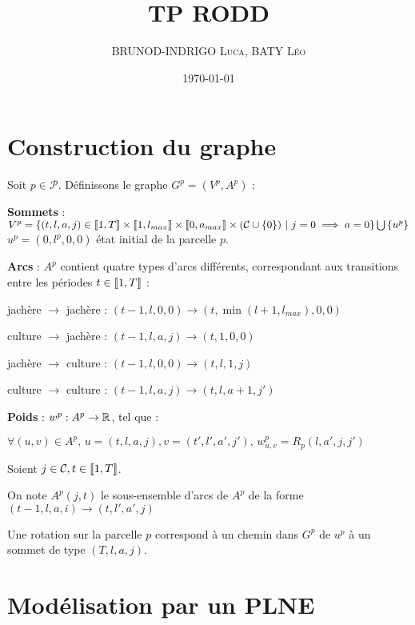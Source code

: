 \documentclass[12pt]{article}
\title{TP RODD}
\date{\today}
\author{\textsc{BRUNOD-INDRIGO Luca}, \textsc{BATY Léo}}
\begin{document}
\maketitle

\section{Construction du graphe}

\noindent Soit $p\in \mathcal{P}$. Définissons le graphe $G^p = (V^p, A^p)$ :
\begin{arrowlist}
    \item \textbf{Sommets} : $V^p = \{ (t, l, a, j)\in \llb 1, T \rrb \times \llb 1, l_{max} \rrb \times \llb 0, a_{max} \rrb \times (\mathcal{C} \cup \{0\}) | j=0 \implies a=0 \}\bigcup\, \{u^p\}$
    $u^p = (0, l^p, 0, 0)$ état initial de la parcelle $p$.
    \item \textbf{Arcs} : $A^p$ contient quatre types d'arcs différents, correspondant aux transitions entre les périodes $t\in \llbracket 1, T \rrbracket$ :
    \begin{bulletlist}
        \item jachère $\rightarrow$ jachère : $(t-1, l, 0, 0) \rightarrow (t, \min(l+1, l_{max}), 0, 0)$
        \item culture $\rightarrow$ jachère : $(t-1, l, a, j) \rightarrow (t, 1, 0, 0)$
        \item jachère $\rightarrow$ culture : $(t-1, l, 0, 0) \rightarrow (t, l, 1, j)$
        \item culture $\rightarrow$ culture : $(t-1, l, a, j) \rightarrow (t, l, a+1, j')$
    \end{bulletlist}
    \item \textbf{Poids} : $w^p : A^p \rightarrow \mathbb{R}$, tel que : 
    
    $\forall(u, v)\in A^p,\, u = (t, l, a, j), v = (t', l', a', j'),\, \boxed{w^p_{u, v} = R_p(l, a', j, j')}$
    \item Soient $j\in\mathcal{C}, t\in \llbracket 1, T\rrbracket$.
    
    On note $A^p(j, t)$ le sous-ensemble d'arcs de $A^p$ de la forme $(t-1, l, a, i) \rightarrow (t, l', a', j)$
\end{arrowlist}

\noindent Une rotation sur la parcelle $p$ correspond à un chemin dans $G^p$ de $u^p$ à un sommet de type $(T, l, a, j)$.

\section{Modélisation par un PLNE}
\end{document}
